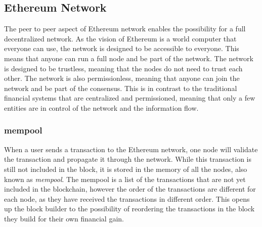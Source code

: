 \subsection{Ethereum Network}
The peer to peer aspect of Ethereum network enables the possibility for a full decentralized network. As the vision of Ethereum is a world computer that everyone can use, the network is designed to be accessible to everyone. This means that anyone can run a full node and be part of the network. The network is designed to be trustless, meaning that the nodes do not need to trust each other. The network is also permissionless, meaning that anyone can join the network and be part of the consensus. This is in contrast to the traditional financial systems that are centralized and permissioned, meaning that only a few entities are in control of the network and the information flow.


\subsubsection{mempool}
When a user sends a transaction to the Ethereum network, one node will validate the transaction and propagate it through the network. While this transaction is still not included in the block, it is stored in the memory of all the nodes, also known as \textit{mempool}. The mempool is a list of the transactions that are not yet included in the blockchain, however the order of the transactions are different for each node, as they have received the transactions in different order. This opens up the block builder to the possibility of reordering the transactions in the block they build for their own financial gain.


